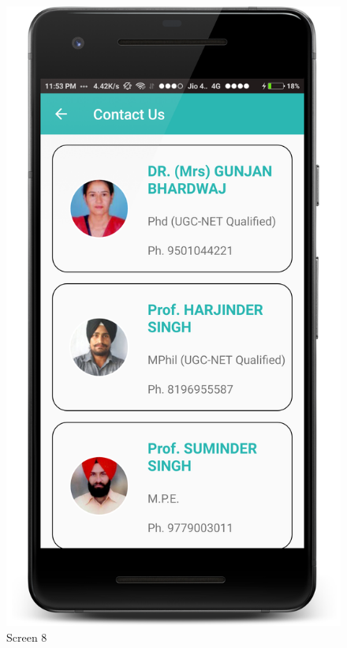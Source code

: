 \begin{figure}[ht]
\centering
\includegraphics[scale=0.13]{images/S8.png}
\caption{Screen 8}
\end{figure}

\newpage

